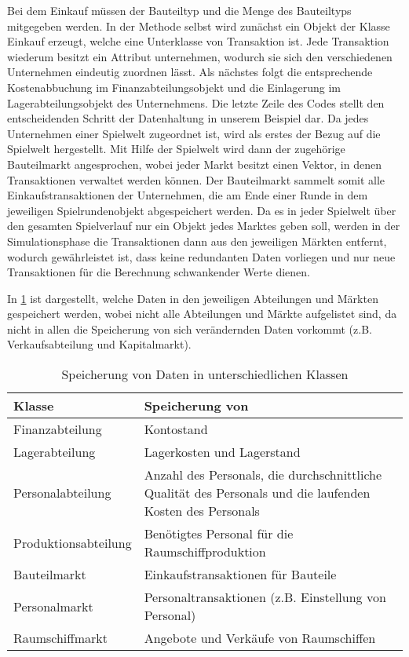 Bei dem Einkauf müssen der Bauteiltyp und die Menge des Bauteiltyps mitgegeben werden. In der Methode selbst wird zunächst ein Objekt der Klasse Einkauf erzeugt, welche eine Unterklasse von Transaktion ist. Jede Transaktion wiederum besitzt ein Attribut unternehmen, wodurch sie sich den verschiedenen Unternehmen eindeutig zuordnen lässt. Als nächstes folgt die entsprechende Kostenabbuchung im Finanzabteilungsobjekt und die Einlagerung im Lagerabteilungsobjekt des Unternehmens. Die letzte Zeile des Codes stellt den entscheidenden Schritt der Datenhaltung in unserem Beispiel dar. Da jedes Unternehmen einer Spielwelt zugeordnet ist, wird als erstes der Bezug auf die Spielwelt hergestellt. Mit Hilfe der Spielwelt wird dann der zugehörige Bauteilmarkt angesprochen, wobei jeder Markt besitzt einen Vektor, in denen Transaktionen verwaltet werden können. Der Bauteilmarkt sammelt somit alle Einkaufstransaktionen der Unternehmen, die am Ende einer Runde in dem jeweiligen Spielrundenobjekt abgespeichert werden. Da es in jeder Spielwelt über den gesamten Spielverlauf nur ein Objekt jedes Marktes geben soll, werden in der Simulationsphase die Transaktionen dann aus den jeweiligen Märkten entfernt, wodurch gewährleistet ist, dass keine redundanten Daten vorliegen und nur neue Transaktionen für die Berechnung schwankender Werte dienen.

In \ref{tab:fachkonzept-implementierung-erlaeuterung-datenhaltung} ist dargestellt, welche Daten in den jeweiligen Abteilungen und Märkten gespeichert werden, wobei nicht alle Abteilungen und Märkte aufgelistet sind, da nicht in allen die Speicherung von sich verändernden Daten vorkommt (z.B. Verkaufsabteilung und Kapitalmarkt).

\begin{table}[ht]\small
     \centering
     \begin{tabular}{| p{4cm} |p{\textwidth -5cm} |}
          \hline
          Klasse & Speicherung von \\
          \hline \hline
          Finanzabteilung & Kontostand \\ \hline
          Lagerabteilung & Lagerkosten und Lagerstand  \\ \hline
          Personalabteilung & Anzahl des Personals, die durchschnittliche Qualität des Personals und die laufenden Kosten des Personals \\ \hline
          Produktionsabteilung & Benötigtes Personal für die Raumschiffproduktion \\ \hline
          Bauteilmarkt & Einkaufstransaktionen für Bauteile \\ \hline
          Personalmarkt & Personaltransaktionen (z.B. Einstellung von Personal) \\ \hline
          Raumschiffmarkt & Angebote und Verkäufe von Raumschiffen \\
          \hline
     \end{tabular}
     \caption{Speicherung von Daten in unterschiedlichen Klassen}
     \label{tab:fachkonzept-implementierung-erlaeuterung-datenhaltung}
\end{table}


